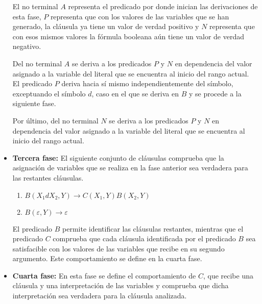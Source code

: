 \documentclass{article}
\begin{document}
\begin{itemize}
          El no terminal $A$ representa el predicado por donde inician las derivaciones de esta fase, $P$ representa que con los valores de las variables que se han generado, la cláusula ya tiene un valor de verdad positivo y $N$ representa que con esos mismos valores la fórmula booleana aún tiene un valor de verdad negativo.

          Del no terminal $A$ se deriva a los predicados $P$ y $N$ en dependencia del valor asignado a la variable del literal que se encuentra al inicio del rango actual. El predicado $P$ deriva hacia sí mismo independientemente del símbolo, exceptuando el símbolo $d$, caso en el que se deriva en $B$ y se procede a la siguiente fase.

          Por último, del no terminal $N$ se deriva a los predicados $P$ y $N$ en dependencia del valor asignado a la variable del literal que se encuentra al inicio del rango actual.

    \item \textbf{Tercera fase:} El siguiente conjunto de cláusulas comprueba que la asignación de variables que se realiza en la fase anterior sea verdadera
          para las restantes cláusulas.
          \begin{enumerate}[start=21]
              \item $B(X_1dX_2,Y)\to C(X_1,Y) B(X_2,Y)$
              \item $B(\varepsilon,Y)\to\varepsilon$
          \end{enumerate}

          El predicado $B$ permite identificar las cláusulas restantes, mientras que el predicado $C$ comprueba que cada cláusula identificada por el predicado $B$ sea satisfacible con los valores de las variables que recibe en su segundo argumento. Este comportamiento se define en la cuarta fase.

    \item \textbf{Cuarta fase:} En esta fase se define el comportamiento de $C$, que recibe una cláusula y una
          interpretación de las variables y comprueba que dicha interpretación sea verdadera para la cláusula analizada.
          \begin{enumerate}[start=23]
\end{enumerate}
\end{itemize}
\end{document}
